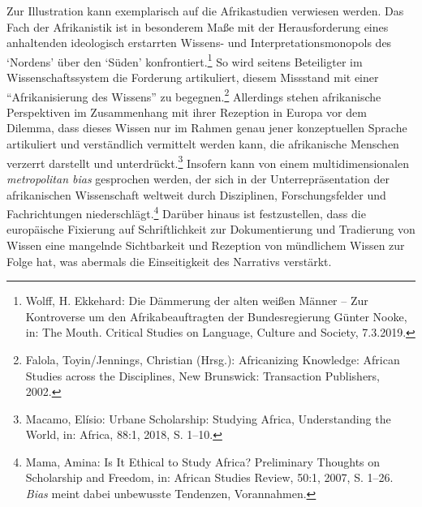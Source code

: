 \documentclass[a4paper,
fontsize=11pt,
oneside,
numbers=noperiodatend,
parskip=half-,
bibliography=totoc,
final
]{scrartcl}
\begin{document}
Zur Illustration kann exemplarisch auf die Afrikastudien verwiesen
werden. Das Fach der Afrikanistik ist in besonderem Maße mit der
Herausforderung eines anhaltenden ideologisch erstarrten Wissens- und
Interpretationsmonopols des \enquote*{Nordens} über den \enquote*{Süden}
konfrontiert.\footnote{Wolff, H. Ekkehard: Die Dämmerung der alten
  weißen Männer -- Zur Kontroverse um den Afrikabeauftragten der
  Bundesregierung Günter Nooke, in: The Mouth. Critical Studies on
  Language, Culture and Society, 7.3.2019.} So wird seitens Beteiligter
im Wissenschaftssystem die Forderung artikuliert, diesem Missstand mit
einer \enquote{Afrikanisierung des Wissens} zu begegnen.\footnote{Falola,
  Toyin/Jennings, Christian (Hrsg.): Africanizing Knowledge: African
  Studies across the Disciplines, New Brunswick: Transaction Publishers,
  2002.} Allerdings stehen afrikanische Perspektiven im Zusammenhang mit
ihrer Rezeption in Europa vor dem Dilemma, dass dieses Wissen nur im
Rahmen genau jener konzeptuellen Sprache artikuliert und verständlich
vermittelt werden kann, die afrikanische Menschen verzerrt darstellt und
unterdrückt.\footnote{Macamo, Elísio: Urbane Scholarship: Studying
  Africa, Understanding the World, in: Africa, 88:1, 2018, S. 1--10.}
Insofern kann von einem multidimensionalen \emph{metropolitan bias}
gesprochen werden, der sich in der Unterrepräsentation der afrikanischen
Wissenschaft weltweit durch Disziplinen, Forschungsfelder und
Fachrichtungen niederschlägt.\footnote{Mama, Amina: Is It Ethical to
  Study Africa? Preliminary Thoughts on Scholarship and Freedom, in:
  African Studies Review, 50:1, 2007, S. 1--26. \emph{Bias} meint dabei
  unbewusste Tendenzen, Vorannahmen.} Darüber hinaus ist festzustellen,
dass die europäische Fixierung auf Schriftlichkeit zur Dokumentierung
und Tradierung von Wissen eine mangelnde Sichtbarkeit und Rezeption von
mündlichem Wissen zur Folge hat, was abermals die Einseitigkeit des
Narrativs verstärkt.
\end{document}
